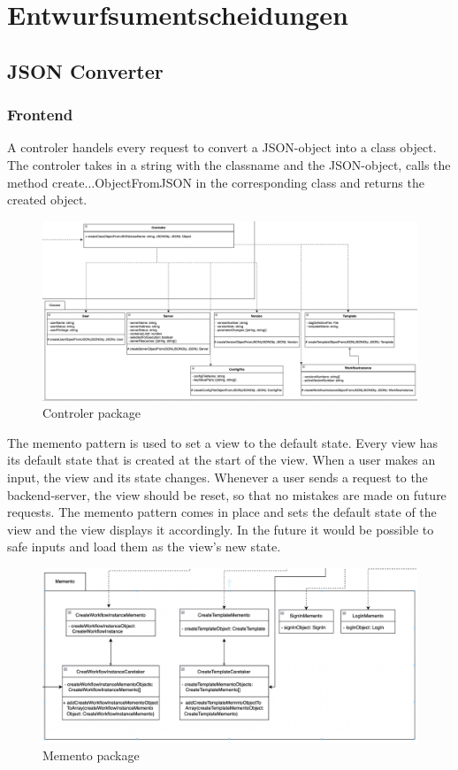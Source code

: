\section{Entwurfsumentscheidungen}

\subsection{JSON Converter}
    \subsubsection{Frontend}
    	A controler handels every request to convert a JSON-object into a class object.
    	The controler takes in a string with the classname and the JSON-object, calls the 
    	method create...ObjectFromJSON in the corresponding class and returns the created object. 
    	\newpage
    	\begin{figure}[H]
            \label{API}
            \centerline{\includegraphics[scale=0.5]{res/Controler.png}}
            \caption{Controler package}
    	\end{figure}
    	The memento pattern is used to set a view to the default state. Every view has its default
    	 state that is created at the start of the view. When a user makes an input, the view and
    	 its state changes. Whenever a user sends a request to the backend-server, the view should
    	 be reset, so that no mistakes are made on future requests. The memento pattern comes in
    	 place and sets the default state of the view and the view displays it accordingly. In
    	 the future it would be possible to safe inputs and load them as the view's new state.
    	\begin{figure}[H]
            \label{API}
            \centerline{\includegraphics[scale=0.5]{res/Memento.png}}
            \caption{Memento package}
    	\end{figure}
